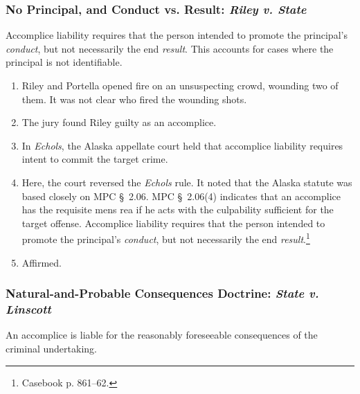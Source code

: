\subsubsection{No Principal, and Conduct vs. Result: \emph{Riley v. State}}

Accomplice liability requires that the person intended to promote the 
principal's \emph{conduct}, but not necessarily the end \emph{result}. This 
accounts for cases where the principal is not identifiable.

\begin{enumerate}
    \item Riley and Portella opened fire on an unsuspecting crowd, wounding 
    two of them. It was not clear who fired the wounding shots.
    \item The jury found Riley guilty as an accomplice.
    \item In \emph{Echols}, the Alaska appellate court held that accomplice 
    liability requires intent to commit the target crime.
    \item Here, the court reversed the \emph{Echols} rule. It noted that the 
    Alaska statute was based closely on MPC \S\ 2.06. MPC \S\ 2.06(4) 
    indicates that an accomplice has the requisite mens rea if he acts with 
    the culpability sufficient for the target offense. Accomplice liability 
    requires that the person intended to promote the principal's 
    \emph{conduct}, but not necessarily the end 
    \emph{result}.\footnote{Casebook p. 861--62.}
    \item Affirmed.
\end{enumerate}

\subsubsection{Natural-and-Probable Consequences Doctrine: \emph{State v. 
Linscott}}

An accomplice is liable for the reasonably foreseeable consequences of the 
criminal undertaking.

